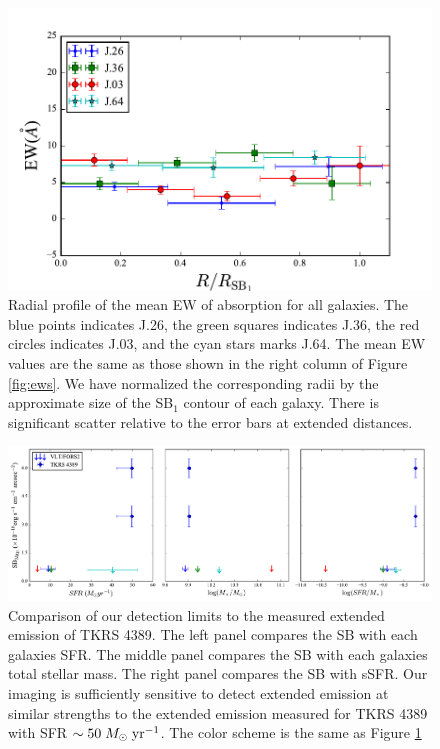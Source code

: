\documentclass[twocolumn]{aastex61}
\def \msunperyr {{\; M_{\odot}\rm \;yr^{-1}}}
\begin{document}
\begin{figure}[!htb]
\centering
\includegraphics[scale=0.7]{ew_comb.pdf}
\caption{Radial profile of the mean EW of  absorption for all galaxies. The blue points indicates J.26, the green squares indicates J.36, the red circles indicates J.03, and the cyan stars marks J.64. The mean EW values are the same as those shown in the right column of Figure \ref{fig:ews}. We have normalized the corresponding radii by the approximate size of the SB$_1$ contour of each galaxy. There is significant scatter relative to the error bars at extended distances.}
\label{fig:ew_comb}
\end{figure}

\begin{figure}[!htb]
\centering
\includegraphics[scale=0.57]{all_limitsv2.pdf}
\caption{Comparison of our detection limits to the measured extended emission of TKRS 4389. The left panel compares the SB with each galaxies SFR. The middle panel compares the SB with each galaxies total stellar mass. The right panel compares the SB with sSFR.  Our imaging is sufficiently sensitive to detect extended emission at similar strengths to the extended emission measured for TKRS 4389 with SFR $\sim 50 \msunperyr$. The color scheme is the same as Figure \ref{fig:ew_comb}}
\label{fig:all_limits}
\end{figure}
\end{document}
